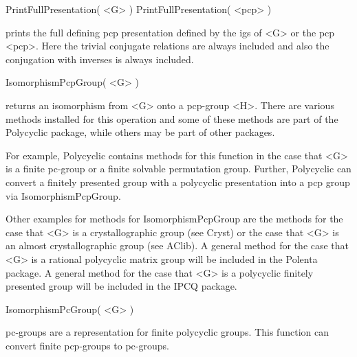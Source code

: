 \> PrintFullPresentation( <G> )
\> PrintFullPresentation( <pcp> )

prints the full defining pcp presentation defined by the igs of <G> or the 
pcp <pcp>. Here the trivial conjugate relations are always included and also
the conjugation with inverses is always included.


\>IsomorphismPcpGroup( <G> )

returns an isomorphism from <G> onto a pcp-group <H>. There are various
methods installed for this operation and some of these methods are part
of the Polycyclic package, while others may be part of other packages. 

For example, Polycyclic contains methods for this function in the case
that <G> is a finite pc-group or a finite solvable permutation group. 
Further, Polycyclic can convert a finitely presented group with a 
polycyclic presentation into a pcp group via IsomorphismPcpGroup.

Other examples for methods for IsomorphismPcpGroup are the methods for
the case that <G> is a crystallographic group (see Cryst) or the case
that <G> is an almost crystallographic group (see AClib). A general 
method for the case that <G> is a rational polycyclic matrix group will
be included in the Polenta package. A general method for the case that
<G> is a polycyclic finitely presented group will be included in the
IPCQ package. 

\>IsomorphismPcGroup( <G> )

pc-groups are a representation for finite polycyclic groups. This function
can convert finite pcp-groups to pc-groups.

